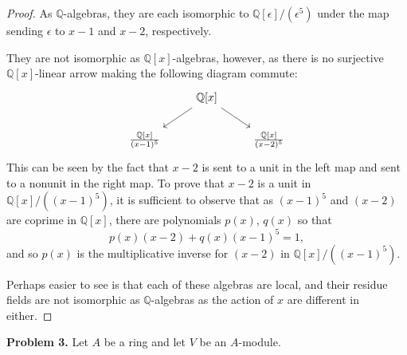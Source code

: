 \documentclass[reqno]{amsart}
\theoremstyle{definition}
\theoremstyle{remark}
\newcommand{\prob}[1] {
  \textbf{Problem #1.}
}
\begin{document}
\begin{proof}
  As $\mathbb{Q}$-algebras, they are each isomorphic to
  $\mathbb{Q}[\epsilon]/(\epsilon^5)$ under the map sending $\epsilon$ to $x-1$
  and $x-2$, respectively.

  They are not isomorphic as $\mathbb{Q}[x]$-algebras, however, as there is no
  surjective $\mathbb{Q}[x]$-linear arrow making the following diagram commute:
  \[
    \begin{tikzcd}
      &\mathbb{Q}[x] \ar[dr] \ar[dl] & \\
      \frac{\mathbb{Q}[x]}{(x-1)^5} & & \frac{\mathbb{Q}[x]}{(x-2)^5}
    \end{tikzcd}
  \]
  This can be seen by the fact that $x-2$ is sent to a unit in the left map and
  sent to a nonunit in the right map. To prove that $x-2$ is a unit in
  $\mathbb{Q}[x]/((x-1)^5)$, it is sufficient to observe that as $(x-1)^5$ and
  $(x-2)$ are coprime in $\mathbb{Q}[x]$, there are polynomials $p(x)$, $q(x)$
  so that
  \[
    p(x)(x-2) + q(x)(x-1)^5 = 1,
  \]
  and so $p(x)$ is the multiplicative inverse for $(x-2)$ in
  $\mathbb{Q}[x]/((x-1)^5)$.

  Perhaps easier to see is that each of these algebras are local, and their
  residue fields are not isomorphic as $\mathbb{Q}$-algebras as the action of
  $x$ are different in either.
\end{proof}

\prob{3} Let $A$ be a ring and let $V$ be an $A$-module.
\end{document}

